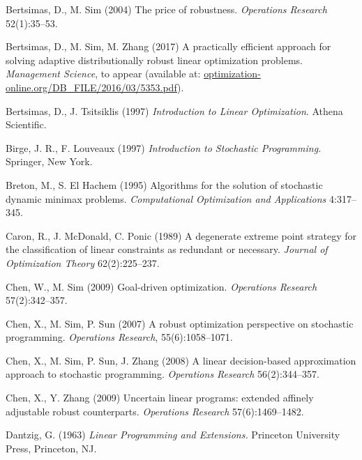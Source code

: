 \documentclass[fleqn,mnsc,blindrev]{informs4}
\begin{document}
\begin{thebibliography}{}
			Bertsimas, D., M. Sim (2004)
			The price of robustness. {\it Operations Research} 52(1):35--53.
			
			Bertsimas, D., M. Sim,  M. Zhang  (2017)
			A practically efficient approach for solving adaptive distributionally robust linear optimization problems. {\it Management Science}, to appear (available at: { \url{optimization-online.org/DB_FILE/2016/03/5353.pdf}}).
			
			Bertsimas, D.,  J. Tsitsiklis (1997)
			{\it Introduction to Linear Optimization}. Athena Scientific.
			
			Birge, J. R., F. Louveaux (1997)
			{\it Introduction to Stochastic Programming.} Springer, New York.
			
			Breton, M., S. El Hachem (1995)
			Algorithms for the solution of stochastic dynamic minimax problems. {\it Computational Optimization and Applications} 4:317--345.
			
			
			Caron, R., J. McDonald, C. Ponic (1989)
			A degenerate extreme point strategy for the classification of linear constraints as redundant or necessary. {\it Journal of Optimization Theory} 62(2):225--237.
			
			
			
			Chen, W., M. Sim (2009)
			Goal-driven optimization.
			{\it Operations Research} 57(2):342--357.
			
			Chen, X., M. Sim,  P. Sun (2007)
			A robust optimization perspective on stochastic programming.
			{\it Operations Research}, 55(6):1058--1071.
			
			Chen, X., M. Sim, P. Sun, J. Zhang (2008)
			A linear decision-based approximation approach to stochastic programming. {\it Operations Research} 56(2):344--357.
			
			Chen, X., Y. Zhang (2009)
			Uncertain linear programs: extended affinely adjustable robust counterparts. {\it Operations Research} 57(6):1469--1482.
			
			Dantzig, G. (1963)
			{\it  Linear Programming and Extensions.} Princeton University Press, Princeton, NJ.
			


\end{thebibliography}
\end{document}
